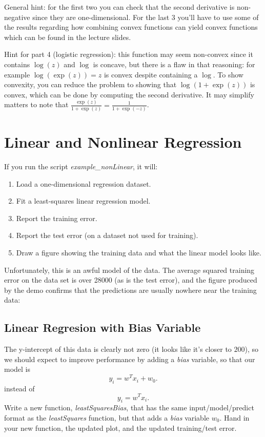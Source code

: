 \documentclass{article}
\def\blu#1{{\color{blu}#1}}
\newcommand{\centerfig}[2]{\begin{center}\texttt{[image: a3f/\#2]}\end{center}}
\def\enum#1{\begin{enumerate}#1\end{enumerate}}
\begin{document}
General hint: for the first two you can check that the second derivative is non-negative since they are one-dimensional. For the last 3 you'll have to use some of the results regarding how combining convex functions can yield convex functions which can be found in the lecture slides.

Hint for part 4 (logistic regression): this function may seem non-convex since it contains $\log(z)$ and $\log$ is concave, but there is a flaw in that reasoning: for example $\log(\exp(z))=z$ is convex despite containing a $\log$. To show convexity, you can reduce the problem to showing that $\log(1+\exp(z))$ is convex, which can be done by computing the second derivative. It may simplify matters to note that $\frac{\exp(z)}{1+\exp(z)} = \frac{1}{1+\exp(-z)}$.



\section{Linear and Nonlinear Regression}


If you run the script \emph{example\_nonLinear}, it will:
\enum{
\item Load a one-dimensional regression dataset.
\item Fit a least-squares linear regression model.
\item Report the training error.
\item Report the test error (on a dataset not used for training).
\item Draw a figure showing the training data and what the linear model looks like.
}
Unfortunately, this is an awful model of the data. The average squared training error on the data set is over 28000 (as is the test error), and the figure produced by the demo confirms that the predictions are usually nowhere near the training data:


\subsection{Linear Regresion with Bias Variable}

The y-intercept of this data is clearly not zero (it looks like it's closer to $200$), so we should expect to improve performance by adding a \emph{bias} variable, so that our model is
\[
y_i = w^Tx_i + w_0.
\]
instead of
\[
y_i = w^Tx_i.
\]
\blu{Write a new function, \emph{leastSquaresBias}, that has the same input/model/predict format as the \emph{leastSquares} function, but that adds a \emph{bias} variable $w_0$. Hand in your new function, the updated plot, and the updated training/test error.}
\end{document}
